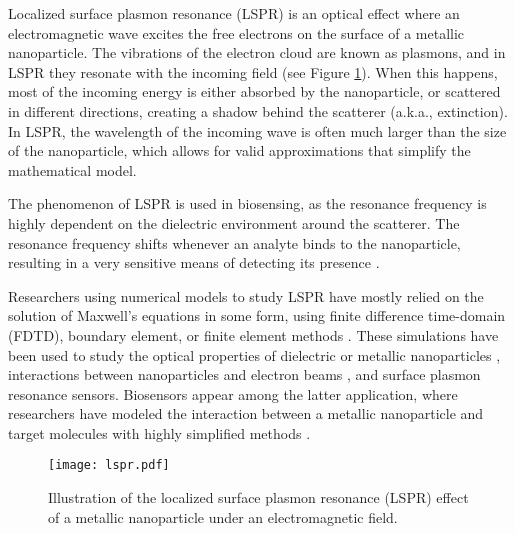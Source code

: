 
Localized surface plasmon resonance (LSPR) is an optical effect where an 
electromagnetic wave excites the free electrons on the surface of a metallic nanoparticle.
The vibrations of the electron cloud are known as plasmons, and in LSPR they resonate with the incoming
field (see Figure \ref{fig:lspr}). When this happens, most of the incoming energy
is either absorbed by the nanoparticle, or scattered in different directions,
creating a shadow behind the scatterer (a.k.a., extinction). In LSPR,
the wavelength of the incoming wave is often much larger than 
the size of the nanoparticle, 
which allows for valid approximations that simplify the mathematical model.

The phenomenon of LSPR is used in biosensing, 
as the resonance frequency is highly dependent on the dielectric environment 
around the scatterer. 
The resonance frequency shifts whenever an analyte binds to the nanoparticle, 
resulting in a very sensitive means of detecting its presence \cite{HaesETal2004, HaesVanduyne2002}.

Researchers using numerical models to study LSPR have mostly relied on the 
solution of Maxwell's equations in some form, using finite difference time-domain (FDTD),
boundary element, or finite element methods \cite{SolisTaboadaObelleiroLiz-MaarzanGarciadeabajo2014}. 
These simulations have been used to study the 
optical properties of dielectric or metallic nanoparticles \cite{Hohenester2018,HohenesterTrugler2012,
JungPedersenSondergaardPedersenLarsenNielsen2010, VideenSun2003,
MayergoyzFredkinZhang2005, MayergoyzZhang2007}, interactions between nanoparticles
and electron beams \cite{GarciadeabajoAizpurua1997, GarciadeabajoHowie2002},
and surface plasmon resonance sensors.
Biosensors appear among the latter application, where researchers have modeled the 
interaction between a metallic nanoparticle and target molecules with highly 
simplified methods \cite{JungCampbellChinowskyMarYee1998,HaesVanduyne2002,DavisGomezVernon2010,AntosiewiczApellClaudioKall2011}.

\begin{figure}[h] %
   \centering
   \texttt{[image: lspr.pdf]} 
   \caption{Illustration of the localized surface plasmon resonance (LSPR) effect of a metallic nanoparticle under an electromagnetic field. }
   \label{fig:lspr}
\end{figure}

